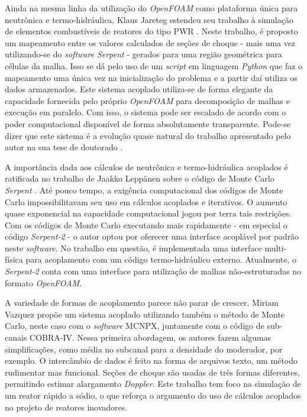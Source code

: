 Ainda na mesma linha da utilização do \textit{OpenFOAM} como plataforma única para neutrônica e
termo-hidráulica, Klaus Jareteg estendeu seu trabalho à simulação de elementos combustíveis de
reatores do tipo PWR \cite{Jareteg2015}. Neste trabalho, é proposto um mapeamento entre os valores
calculados de seções de choque - mais uma vez utilizando-se do \textit{software Serpent} - gerados
para uma região geométrica para células da malha. Isso se dá pelo uso de um \textit{script} em
linguagem \textit{Python} que faz o mapeamento uma única vez na inicialização do problema e
a partir daí utiliza os dados armazenados. Este sistema acoplado utiliza-se de forma elegante da
capacidade fornecida pelo próprio \textit{OpenFOAM} para decomposição de malhas e execução em paralelo.
Com isso, o sistema pode ser escalado de acordo com o poder computacional disponível de forma
absolutamente transparente. Pode-se dizer que este sistema é a evolução quase natural do trabalho
apresentado pelo autor na sua tese de doutorado \cite{Jareteg2012}.



A importância dada aos cálculos de neutrônica e termo-hidráulica acoplados
é ratificada no trabalho de Jaakko Leppänen sobre o código de Monte Carlo
\textit{Serpent} \cite{Leppanen2012}. Até pouco tempo, a exigência computacional dos códigos
de Monte Carlo impossibilitavam seu uso em cálculos acoplados e iterativos. O aumento
quase exponencial na capacidade computacional jogou por terra tais restrições.
Com os códigos de Monte Carlo executando mais rapidamente - em especial o código \textit{Serpent-2} -
o autor optou por oferecer uma interface acoplável por padrão neste \textit{software}.
No trabalho em questão, é implementada uma interface multi-física para acoplamento com um
código termo-hidráulico externo. Atualmente, o \textit{Serpent-2} conta com uma interface para utilização
de malhas não-estruturadas no formato \textit{OpenFOAM}.

A variedade de formas de acoplamento parece não parar de crescer. Miriam Vazquez
\cite{Vazquez2012} propõe
um sistema acoplado utilizando também o método de Monte Carlo, neste caso com o
\textit{software} MCNPX, juntamente com o código de sub-canais COBRA-IV. Nessa primeira
abordagem, os autores fazem algumas simplificações, como média no subcanal para a
densidade do moderador, por exemplo. O intercâmbio de dados é feito na forma de arquivos
texto, um método rudimentar mas funcional. Seções de choque são usadas de três formas
diferentes, permitindo estimar alargamento \textit{Doppler}. Este trabalho tem foco na simulação
de um reator rápido a sódio, o que reforça o argumento do uso de cálculos acoplados no projeto
de reatores inovadores.


